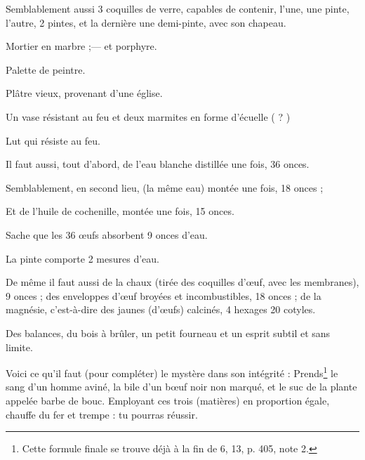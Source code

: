 \documentclass[a4paper, 11pt, oneside, polutonikogreek, french]{article}
\begin{document}
Semblablement aussi 3 coquilles de verre, capables de contenir, l'une, une pinte, l'autre, 2 pintes, et la dernière une demi-pinte, avec son chapeau.

Mortier en marbre ;--- et porphyre.

Palette de peintre.

Plâtre vieux, provenant d'une église.

Un vase résistant au feu et deux marmites en forme d'écuelle ( ? )

Lut qui résiste au feu.

Il faut aussi, tout d'abord, de l'eau blanche distillée une fois, 36 onces.

Semblablement, en second lieu, (la même eau) montée une fois, 18 onces ;

Et de l'huile de cochenille, montée une fois, 15 onces.

Sache que les 36 œufs absorbent 9 onces d'eau.

La pinte comporte 2 mesures d'eau.

De même il faut aussi de la chaux (tirée des coquilles d'œuf, avec les membranes), 9 onces ; des enveloppes d'œuf broyées et incombustibles, 18 onces ; de la magnésie, c'est-à-dire des jaunes (d'œufs) calcinés, 4 hexages 20 cotyles.

Des balances, du bois à brûler, un petit fourneau et un esprit subtil et sans limite.

Voici ce qu'il faut (pour compléter) le mystère dans son intégrité : Prends\footnote{Cette formule finale se trouve déjà à la fin de 6, 13, p. 405, note 2.} le sang d'un homme aviné, la bile d'un bœuf noir non marqué, et le suc de la plante appelée barbe de bouc. Employant ces trois (matières) en proportion égale, chauffe du fer et trempe : tu pourras réussir.

\bigskip
\centerline{\EightStarTaper}
\centerline{\EightStarTaper\EightStarTaper}
\bigskip
\end{document}
